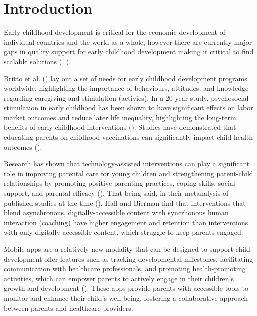 



\clearpage

\section{Introduction}

Early childhood development is critical for the economic development of individual countries and the world as a whole, however there are currently major gaps in quality support for early childhood development making it critical to find scalable solutions (\cite{Black2018}, \cite{Attanasio2022}).

Britto et al. (\parencite*{Britto2017}) lay out a set of needs for early childhood development programs worldwide, highlighting the importance of behaviours, attitudes, and knowledge regarding caregiving and stimulation (activies). In a 20-year study, psychosocial stimulation in early childhood has been shown to have significant effects on labor market outcomes and reduce later life inequality, highlighting the long-term benefits of early childhood interventions (\cite{Gertler2015}). Studies have demonstrated that educating parents on childhood vaccinations can significantly impact child health outcomes (\cite{Lukusa2018}).

Research has shown that technology-assisted interventions can play a significant role in improving parental care for young children and strengthening parent-child relationships by promoting positive parenting practices, coping skills, social support, and parental efficacy (\cite{Hall2015}). That being said, in their metanalysis of published studies at the time (\parencite*{Hall2015}), Hall and Bierman find that interventions that blend asynchronous, digitally-accessible content with syncrhonous human interaction (coaching) have higher engagement and retention than interventions with only digitally accessible content, which struggle to keep parents engaged.

 Mobile apps are a relatively new modality that can be designed to support child development offer features such as tracking developmental milestones, facilitating communication with healthcare professionals, and promoting health-promoting activities, which can empower parents to actively engage in their children's growth and development (\cite{Dewitt2022}). These apps provide parents with accessible tools to monitor and enhance their child's well-being, fostering a collaborative approach between parents and healthcare providers.

